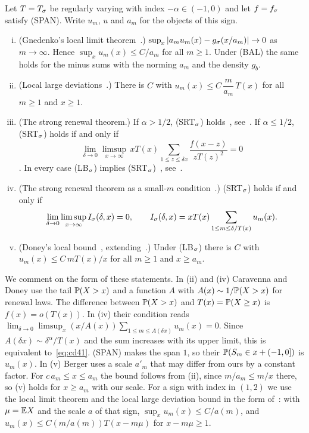 \begin{lemma}\label{lem:cd}
Let $T=T_\sigma$ be regularly varying with index $-\alpha\in(-1,0)$ and let $f=f_\sigma$ satisfy
(SPAN). Write $u_m$, $u$ and $a_m$ for the objects of this sign.
\begin{enumerate}[(i)]
\item (Gnedenko's local limit theorem~\cite[Theorem~4.2.1]{ibragimovlinnik1971}.)
$\sup_x|a_mu_m(x)-g_\sigma(x/a_m)|\to0$ as $m\to\infty$. Hence $\sup_xu_m(x)\le C/a_m$ for all
$m\ge1$. Under (BAL) the same holds for the minus sums with the norming $a_m$ and the
density $g_b$.
\item (Local large deviations~\cite[Theorem~1.1, Eq.~(1.6)]{caravennadoney2019}.)
There is $C$ with $u_m(x)\le C\,\dfrac m{a_m}\,T(x)$ for all $m\ge1$ and $x\ge1$.
\item (The strong renewal theorem.) If $\alpha>1/2$, (SRT$_\sigma$)
holds~\cite{garsialamperti1963,erickson1970}, see~\cite[Theorem~1.4]{caravennadoney2019}.
If $\alpha\le1/2$, (SRT$_\sigma$) holds if and only if
\[
 \lim_{\delta\to0}\limsup_{x\to\infty}\,xT(x)\sum_{1\le z\le\delta x}
 \frac{f(x-z)}{zT(z)^2}=0
\]
\cite[Theorem~1.4]{caravennadoney2019}. In every case (LB$_\sigma$) implies
(SRT$_\sigma$)~\cite{doney1997}, see~\cite[Eq.~(1.15)]{caravennadoney2019}.
\item (The strong renewal theorem as a small-$m$ condition~\cite[Section~4.1,
Eq.~(4.1)]{caravennadoney2019}.) (SRT$_\sigma$) holds if and only if
\begin{equation}\label{eq:cd41}
 \lim_{\delta\to0}\limsup_{x\to\infty}I_\sigma(\delta,x)=0,\qquad
 I_\sigma(\delta,x)=xT(x)\sum_{1\le m\le\delta/T(x)}u_m(x).
\end{equation}
\item (Doney's local bound~\cite[Theorem~2.4]{berger2019ptrf}, extending~\cite[Theorem~A]{doney1997}.)
Under (LB$_\sigma$) there is $C$ with $u_m(x)\le C\,mT(x)/x$ for all $m\ge1$
and $x\ge a_m$.
\end{enumerate}
\end{lemma}

We comment on the form of these statements. In (ii) and (iv) Caravenna and Doney
use the tail $\mathbb{P}(X>x)$ and a function $A$ with $A(x)\sim1/\mathbb{P}(X>x)$ for renewal
laws. The difference between $\mathbb{P}(X>x)$ and $T(x)=\mathbb{P}(X\ge x)$ is
$f(x)=o(T(x))$. In (iv) their condition reads
$\lim_{\delta\to0}\limsup_x(x/A(x))\sum_{1\le m\le A(\delta x)}u_m(x)=0$. Since
$A(\delta x)\sim\delta^\alpha/T(x)$ and the sum increases with its upper limit, this
is equivalent to~\eqref{eq:cd41}. (SPAN) makes the span $1$, so their
$\mathbb{P}(S_m\in x+(-1,0])$ is $u_m(x)$. In (v) Berger uses a scale $a'_m$ that may differ
from ours by a constant factor. For $c\,a_m\le x\le a_m$ the bound follows from (ii),
since $m/a_m\le m/x$ there, so (v) holds for $x\ge a_m$ with our scale. For a sign with
index in $(1,2)$ we use the local limit theorem and the local large deviation bound in
the form of~\cite[Lemma~A.1]{paperF}: with $\mu=\mathbb{E} X$ and the scale $a$ of that sign,
$\sup_xu_m(x)\le C/a(m)$, and $u_m(x)\le C(m/a(m))T(x-m\mu)$ for $x-m\mu\ge1$.

